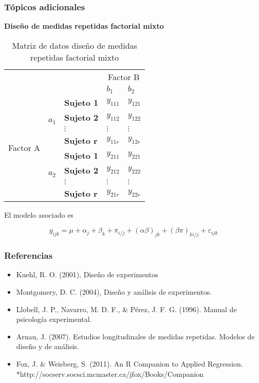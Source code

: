 \documentclass[12pt]{beamer}
\begin{document}
 
\begin{frame}
\frametitle{Tópicos adicionales}
\textbf{Diseño de medidas repetidas factorial mixto}
\begin{table}[htbp]
  \centering
  \resizebox{5cm}{!} {
    \begin{tabular}{|c|c|l|l|l|}
\cline{4-5}    \multicolumn{1}{r}{} & \multicolumn{1}{r}{} &       & \multicolumn{2}{c|}{Factor B} \\
\cline{4-5}    \multicolumn{1}{r}{} & \multicolumn{1}{r}{} &       & $b_1$    & $b_2$ \\
    \hline
    \multirow{8}[16]{*}{Factor A} & \multirow{4}[8]{*}{$a_1$} & \textbf{Sujeto 1} & $y_{111}$  & $y_{121}$ \\
\cline{3-5}          &       & \textbf{Sujeto 2} & $y_{112}$  & $y_{122}$ \\
\cline{3-5}          &       & $\vdots$ & $\vdots$ & $\vdots$ \\
\cline{3-5}          &       & \textbf{Sujeto r} & $y_{11r}$  & $y_{12r}$ \\
\cline{2-5}          & \multirow{4}[8]{*}{$a_2$} & \textbf{Sujeto 1} & $y_{211}$  & $y_{221}$ \\
\cline{3-5}          &       & \textbf{Sujeto 2} & $y_{212}$  & $y_{222}$ \\
\cline{3-5}          &       & $\vdots$ & $\vdots$ & $\vdots$ \\
\cline{3-5}          &       & \textbf{Sujeto r} & $y_{21r}$  & $y_{22r}$ \\
    \hline
    \end{tabular}%
    }
    \caption{Matriz de datos diseño de medidas repetidas factorial mixto}
  \label{tab:addlabel}%
\end{table}%
El modelo asociado es

$$y_{ijk}=\mu+\alpha_j+\beta_k+\pi_{i/j}+(\alpha\beta)_{jk}+(\beta\pi)_{ki/j}+\varepsilon_{ijk}$$
\end{frame}





\begin{frame}
\frametitle{Referencias}
\begin{itemize}
\item Kuehl, R. O. (2001), Diseño de experimentos

\item Montgomery, D. C. (2004), Diseño y análisis de experimentos.

\item Llobell, J. P., Navarro, M. D. F., \& Pérez, J. F. G. (1996). Manual de psicología experimental.

\item Arnau, J. (2007). Estudios longitudinales de medidas repetidas. Modelos de diseño y de análisis. 

\item Fox, J. \&  Weisberg, S. (2011). An {R} Companion to Applied Regression.
*http://socserv.socsci.mcmaster.ca/jfox/Books/Companion
\end{itemize}
\end{frame}
\end{document}
